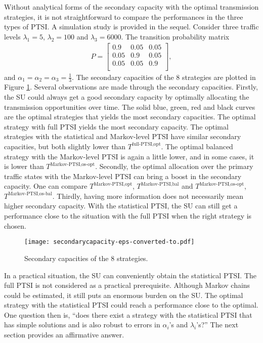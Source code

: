 \documentclass[10pt,final,journal,letterpaper]{IEEEtran}
\begin{document}
\par
Without analytical forms of the secondary capacity with the optimal transmission strategies, it is not straightforward to compare the performances in the three types of PTSI. A simulation study is provided in the sequel. Consider three traffic levels $\lambda_1=5$, $\lambda_2=100$ and $\lambda_3=6000$. The transition probability matrix
\begin{align}
    P=\begin{bmatrix}
        0.9 & 0.05 & 0.05 \\
        0.05 & 0.9 & 0.05 \\
        0.05 & 0.05 & 0.9 \\
      \end{bmatrix},\nonumber
\end{align}
and $\alpha_1=\alpha_2=\alpha_3=\frac{1}{3}$. The secondary capacities of the 8 strategies are plotted in Figure \ref{fig:sc}. Several observations are made through the secondary capacities. Firstly, the SU could always get a good secondary capacity by optimally allocating the transmission opportunities over time. The solid blue, green, red and black curves are the optimal strategies that yields the most secondary capacities. The optimal strategy with full PTSI yields the most secondary capacity. The optimal strategies with the statistical and Markov-level PTSI have similar secondary capacities, but both slightly lower than $T^{\text{full-PTSI,opt}}$. The optimal balanced strategy with the Markov-level PTSI is again a little lower, and in some cases, it is lower than $T^{\text{Markov-PTSI,os-opt}}$. Secondly, the optimal allocation over the primary traffic states with the Markov-level PTSI can bring a boost in the secondary capacity. One can compare $T^{\text{Markov-PTSI,opt}}$, $T^{\text{Markov-PTSI,bal}}$ and $T^{\text{Markov-PTSI,os-opt}}$, $T^{\text{Markov-PTSI,os-bal}}$. Thirdly, having more information does not necessarily mean higher secondary capacity. With the statistical PTSI, the SU can still get a performance close to the situation with the full PTSI when the right strategy is chosen.
\begin{figure}[!t]
\centering
\texttt{[image: secondarycapacity-eps-converted-to.pdf]}
\caption{Secondary capacities of the 8 strategies.}
\label{fig:sc}
\end{figure}

\par
In a practical situation, the SU can conveniently obtain the statistical PTSI. The full PTSI is not considered as a practical prerequisite. Although Markov chains could be estimated, it still puts an enormous burden on the SU. The optimal strategy with the statistical PTSI could reach a performance close to the optimal. One question then is, ``does there exist a strategy with the statistical PTSI that has simple solutions and is also robust to errors in $\alpha_i$'s and $\lambda_i$'s?'' The next section provides an affirmative answer.
\end{document}
